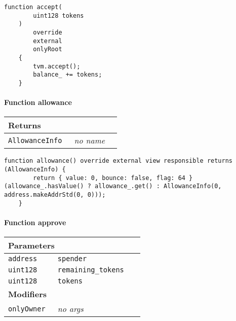 \vspace{2cm}

\begin{lstlisting}[firstnumber=96]
    function accept(
        uint128 tokens
    )
        override
        external
        onlyRoot
    {
        tvm.accept();
        balance_ += tokens;
    }
\end{lstlisting}

\paragraph{Function allowance}


\ifsoltables
\noindent\begin{tabular}{|l|l|p{5cm}|}\hline
\multicolumn{3}{|l|}{\bf Returns}\\\hline
\tt AllowanceInfo & {\em no name} &\\\hline
\end{tabular}
\fi

\vspace{2cm}

\begin{lstlisting}[firstnumber=107]
    function allowance() override external view responsible returns (AllowanceInfo) {
        return { value: 0, bounce: false, flag: 64 } (allowance_.hasValue() ? allowance_.get() : AllowanceInfo(0, address.makeAddrStd(0, 0)));
    }
\end{lstlisting}

\paragraph{Function approve}


\ifsoltables
\noindent\begin{tabular}{|l|l|p{5cm}|}\hline
\multicolumn{3}{|l|}{\bf Parameters}\\\hline
\tt address & \tt spender &\\\hline
\tt uint128 & \tt remaining\_{}tokens &\\\hline
\tt uint128 & \tt tokens &\\\hline
\multicolumn{3}{|l|}{\bf Modifiers}\\\hline
\tt onlyOwner & {\em no args} &\\\hline
\end{tabular}
\fi

\vspace{2cm}

